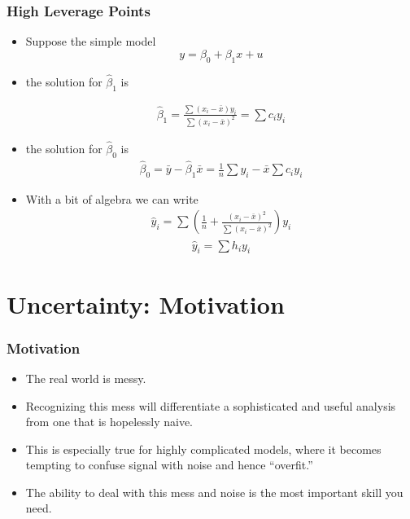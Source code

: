 \documentclass[
  shownotes,
  xcolor={svgnames},
  hyperref={colorlinks,citecolor=DarkBlue,linkcolor=andesred,urlcolor=DarkBlue}
  , aspectratio=169]{beamer}
\begin{document}
\begin{frame}
\frametitle{ High Leverage Points}

\begin{itemize}
  \item Suppose the simple model 
  $$
 y =  \beta_0 + \beta_1 x + u
  $$

  \item the solution for $\hat{\beta}_1$ is

  \begin{align}
  \hat{\beta}_1 = \frac{\sum(x_{i}-\bar{x})y_{i}}{  \sum(x_{i}-\bar{x})^{2}}= \sum c_i y_i
  \end{align}
  \item the solution for $\hat{\beta}_0$ is
  \begin{align}
  \hat{\beta}_0 = \bar{y}-\hat{\beta}_1 \bar{x} =\frac{1}{n}\sum y_i - \bar{x}\sum c_i y_i
  \end{align}
  \item With a bit of algebra we can write
  \begin{align}
  \hat{y}_i = \sum \left( \frac{1}{n} +\frac{(x_i-\bar{x})^2 }{\sum(x_{i}-\bar{x})^{2}} \right) y_i
  \end{align}
  \begin{align}
  \hat{y}_i = \sum h_i y_i
  \end{align}

\end{itemize}


\end{frame}
\section{Uncertainty: Motivation}

\begin{frame}
\frametitle{Motivation}

\begin{itemize}
  \item The real world is messy. 
  \medskip
  \item Recognizing this mess will differentiate a sophisticated and useful analysis from one that is hopelessly naive. 
  \medskip
  \item This is especially true for highly complicated models, where it becomes tempting to confuse signal with noise and hence “overfit.” 
  \medskip
  \item The ability to deal with this mess and noise is the most important skill you need.
\end{itemize}
\end{frame}
\end{document}
